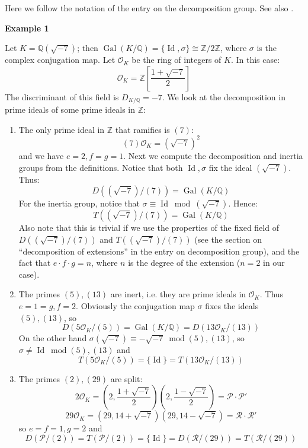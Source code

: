 \documentclass[12pt]{article}
\newcommand{\Ints}{\mathbb{Z}}
\newcommand{\Rats}{\mathbb{Q}}
\begin{document}
Here we follow the notation of the entry on the decomposition
group. See also .

{\bf Example 1}

Let $K=\Rats(\sqrt{-7})$; then
$\operatorname{Gal}(K/\Rats)=\{\operatorname{Id},\sigma\} \cong
\Ints/2\Ints$, where $\sigma$ is the complex conjugation map. Let
$\mathcal{O}_K$ be the ring of integers of $K$. In this case:$$
\mathcal{O}_K=\Ints\left[\frac{1+\sqrt{-7}}{2}\right]$$ The
discriminant of this field is $D_{K/\Rats}=-7$. We look at the
decomposition in prime ideals of some prime ideals in $\Ints$:
\begin{enumerate}
\item The only prime ideal in $\Ints$ that ramifies is $(7)$:
$$(7)\mathcal{O}_K=(\sqrt{-7})^2$$ and we have $e=2,f=g=1$. Next
we compute the decomposition and inertia groups from the
definitions. Notice that both $\operatorname{Id}, \sigma$ fix the
ideal $(\sqrt{-7})$. Thus:
$$D((\sqrt{-7})/(7))=\operatorname{Gal}(K/\Rats)$$
For the inertia group, notice that $\sigma\equiv
\operatorname{Id}\ \operatorname{mod}\ (\sqrt{-7})$. Hence:
$$T((\sqrt{-7})/(7))=\operatorname{Gal}(K/\Rats)$$
Also note that this is trivial if we use the properties of the
fixed field of $D((\sqrt{-7})/(7))$ and $T((\sqrt{-7})/(7))$ (see
the section on ``decomposition of extensions'' in the entry on
decomposition group), and the fact that $e\cdot f\cdot g=n$, where
$n$ is the degree of the extension ($n=2$ in our case).

\item The primes $(5),(13)$ are inert, i.e. they are prime ideals
in $\mathcal{O}_K$. Thus $e=1=g,f=2$. Obviously the conjugation
map $\sigma$ fixes the ideals $(5),(13)$, so
$$D(5\mathcal{O}_K/(5))=\operatorname{Gal}(K/\Rats)=D(13\mathcal{O}_K/(13))$$
On the other hand $\sigma(\sqrt{-7})\equiv-\sqrt{-7}\
\operatorname{mod} (5),(13)$, so $\sigma\neq \operatorname{Id}\
\operatorname{mod} (5),(13)$ and
$$T(5\mathcal{O}_K/(5))=\{\operatorname{Id}\}=T(13\mathcal{O}_K/(13))$$

\item The primes $(2),(29)$ are split:
$$2\mathcal{O}_K={\left( 2,\frac{1+\sqrt{-7}}{2}\right)}{\left(
2,\frac{1-\sqrt{-7}}{2}\right)}=\mathcal{P}\cdot\mathcal{P'}$$
$$29\mathcal{O}_K=\left(29,14+\sqrt{-7}\right)\left(29,14-\sqrt{-7}\right)=\mathcal{R}\cdot\mathcal{R'}$$
so $e=f=1,g=2$ and
$$D(\mathcal{P}/(2))=T(\mathcal{P}/(2))=\{\operatorname{Id}\}=D(\mathcal{R}/(29))=T(\mathcal{R}/(29))$$

\end{enumerate}
\end{document}
